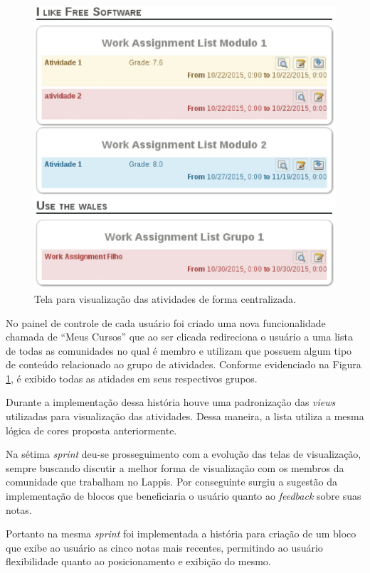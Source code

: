 \begin{figure}[h]
    \centering
    \includegraphics[keepaspectratio=true,scale=0.5]
      {figuras/work-assignment-group-list.eps}
    \caption{Tela para visualização das atividades de forma centralizada.}
    \label{fig:group-list}
\end{figure}

No painel de controle de cada usuário foi criado uma nova funcionalidade chamada de ``Meus Cursos'' que ao ser clicada redireciona o usuário a uma lista de todas as comunidades no qual é membro e utilizam que possuem algum tipo de conteúdo relacionado ao grupo de atividades. Conforme evidenciado na Figura \ref{fig:group-list}, é exibido todas as atidades em seus respectivos grupos.

Durante a implementação dessa história houve uma padronização das \textit{views} utilizadas para visualização das atividades. Dessa maneira, a lista utiliza a mesma lógica de cores proposta anteriormente.

Na sétima \textit{sprint} deu-se prosseguimento com a evolução das telas de visualização, sempre buscando discutir a melhor forma de visualização com os membros da comunidade que trabalham no Lappis. Por conseguinte surgiu a sugestão da implementação de blocos que beneficiaria o usuário quanto ao \textit{feedback} sobre suas notas.

Portanto na mesma \textit{sprint} foi implementada a história para criação de um bloco que exibe ao usuário as cinco notas mais recentes, permitindo ao usuário flexibilidade quanto ao posicionamento e exibição do mesmo.

